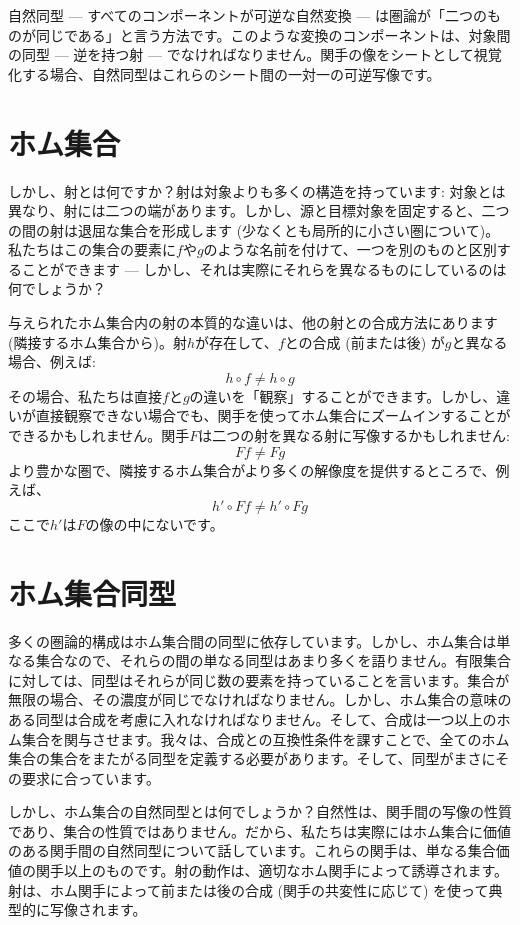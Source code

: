 自然同型 --- すべてのコンポーネントが可逆な自然変換 --- は圏論が「二つのものが同じである」と言う方法です。このような変換のコンポーネントは、対象間の同型 --- 逆を持つ射 --- でなければなりません。関手の像をシートとして視覚化する場合、自然同型はこれらのシート間の一対一の可逆写像です。

\section{ホム集合}

しかし、射とは何ですか？射は対象よりも多くの構造を持っています: 対象とは異なり、射には二つの端があります。しかし、源と目標対象を固定すると、二つの間の射は退屈な集合を形成します (少なくとも局所的に小さい圏について)。私たちはこの集合の要素に$f$や$g$のような名前を付けて、一つを別のものと区別することができます --- しかし、それは実際にそれらを異なるものにしているのは何でしょうか？

与えられたホム集合内の射の本質的な違いは、他の射との合成方法にあります (隣接するホム集合から)。射$h$が存在して、$f$との合成 (前または後) が$g$と異なる場合、例えば: 
\[h \circ f \neq h \circ g\]
その場合、私たちは直接$f$と$g$の違いを「観察」することができます。しかし、違いが直接観察できない場合でも、関手を使ってホム集合にズームインすることができるかもしれません。関手$F$は二つの射を異なる射に写像するかもしれません: 
\[F f \neq F g\]
より豊かな圏で、隣接するホム集合がより多くの解像度を提供するところで、例えば、
\[h' \circ F f \neq h' \circ F g\]
ここで$h'$は$F$の像の中にないです。

\section{ホム集合同型}

多くの圏論的構成はホム集合間の同型に依存しています。しかし、ホム集合は単なる集合なので、それらの間の単なる同型はあまり多くを語りません。有限集合に対しては、同型はそれらが同じ数の要素を持っていることを言います。集合が無限の場合、その濃度が同じでなければなりません。しかし、ホム集合の意味のある同型は合成を考慮に入れなければなりません。そして、合成は一つ以上のホム集合を関与させます。我々は、合成との互換性条件を課すことで、全てのホム集合の集合をまたがる同型を定義する必要があります。そして、同型がまさにその要求に合っています。

しかし、ホム集合の自然同型とは何でしょうか？自然性は、関手間の写像の性質であり、集合の性質ではありません。だから、私たちは実際にはホム集合に価値のある関手間の自然同型について話しています。これらの関手は、単なる集合価値の関手以上のものです。射の動作は、適切なホム関手によって誘導されます。射は、ホム関手によって前または後の合成 (関手の共変性に応じて) を使って典型的に写像されます。


